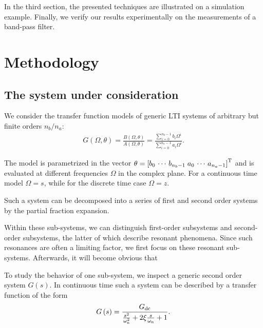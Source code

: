   In the third section, the presented techniques are illustrated on a simulation example.
  Finally, we verify our results experimentally on the measurements of a band-pass filter.

\section{Methodology} \label{sec:method}

  \subsection{The system under consideration}
  We consider the transfer function models of generic \gls{LTI} systems of arbitrary but finite orders $n_b / n_a$:
  \begin{align}
    G\left( \Omega, \theta \right) = \frac{B\left( \Omega,\theta \right)}
                                          {A\left( \Omega,\theta \right)}
                                   = \frac{\sum\limits_{i=0}^{n_b-1} b_i \Omega^i}
                                          {\sum\limits_{i=0}^{n_a-1} a_i \Omega^i}
    \text{.} \label{eq:model}
  \end{align}
  
  The model is parametrized in the vector $\theta = \left[b_0 \,\cdots\, b_{n_b-1} \; a_0 \,\cdots\, a_{n_a-1} \right]^{\mathrm{T}}$ and  is evaluated at different frequencies $\Omega$ in the complex plane.
  For a continuous time model $\Omega = s$, while for the discrete time case $\Omega = z$.

  Such a system can be decomposed into a series of first and second order systems by the partial fraction expansion.
  
  Within these sub-systems, we can distinguish first-order subsystems and second-order subsystems, the latter of which describe resonant phenomena.
  Since such resonances are often a limiting factor, we first focus on these resonant sub-systems.
  Afterwards, it will become obvious that 

  To study the behavior of one sub-system, we inspect a generic second order system $G\left( s \right)$.
  In continuous time such a system can be described by a transfer function of the form
  \begin{equation}
    G\left(s \right) = \frac{G_{\mathrm{dc}}}
                            {             \frac{s^2}
                                               {\omega_{\mathrm{n}}^2} 
                             + 2 \xi \frac{s}
                                               {\omega_{\mathrm{n}}}
                             + 1
                            }
  \text{.}
  \label{eq:secondOrderSystemCT}
  \end{equation}

